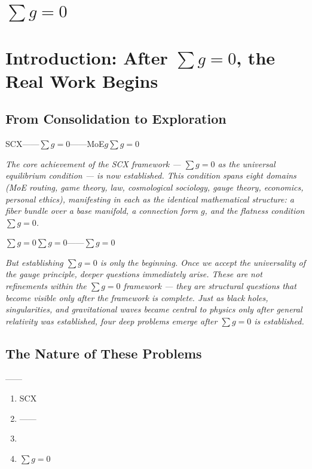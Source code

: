 \documentclass[12pt,a4paper]{article}
\theoremstyle{remark}
\begin{document}
\section{$\sum g = 0$}
\section*{Introduction: After $\sum g = 0$, the Real Work Begins}

\subsection{ From Consolidation to Exploration}

SCX——$\sum g = 0$——MoE$g$$\sum g = 0$

\medskip
\noindent\textit{The core achievement of the SCX framework — $\sum g = 0$ as the universal equilibrium condition — is now established. This condition spans eight domains (MoE routing, game theory, law, cosmological sociology, gauge theory, economics, personal ethics), manifesting in each as the identical mathematical structure: a fiber bundle over a base manifold, a connection form $g$, and the flatness condition $\sum g = 0$.}

\bigskip
$\sum g = 0$$\sum g = 0$——$\sum g = 0$

\medskip
\noindent\textit{But establishing $\sum g = 0$ is only the beginning. Once we accept the universality of the gauge principle, deeper questions immediately arise. These are not refinements within the $\sum g = 0$ framework — they are structural questions that become visible only after the framework is complete. Just as black holes, singularities, and gravitational waves became central to physics only after general relativity was established, four deep problems emerge after $\sum g = 0$ is established.}

\subsection{ The Nature of These Problems}

\"\"\textbf{}——
\begin{enumerate}[label=(\arabic*)]
    \item SCX
    \item ——
    \item 
    \item $\sum g = 0$
\end{enumerate}
\end{document}
